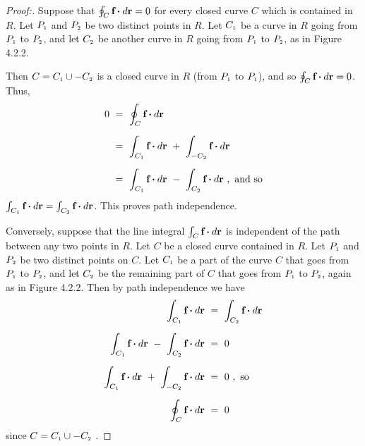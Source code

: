 \begin{proofbar}\begin{proof}[Proof:]
 Suppose that $\oint_{C} \textbf{f} \bm{\cdot} d\textbf{r} = 0$ for every closed curve $C$  which is contained in $R$. Let $P_{\scriptscriptstyle 1}$ and
 $P_{\scriptscriptstyle 2}$ be two distinct points in $R$. Let $C_{\scriptscriptstyle 1}$ be a curve in $R$ going from
 $P_{\scriptscriptstyle 1}$ to $P_{\scriptscriptstyle 2}$, and let $C_{\scriptscriptstyle 2}$ be another curve in $R$ going from $P_{\scriptscriptstyle 1}$ to
 $P_{\scriptscriptstyle 2}$, as in Figure 4.2.2.
 
 \piccaption[]{}
 \par Then $C = C_{\scriptscriptstyle 1} \cup -C_{\scriptscriptstyle 2}$ is a closed curve in $R$ (from
 $P_{\scriptscriptstyle 1}$ to $P_{\scriptscriptstyle 1}$), and so $\oint_{C} \textbf{f} \bm{\cdot} d\textbf{r} = 0$. Thus,
 \begin{align*}
  0 ~&=~ \oint_{C} \textbf{f} \bm{\cdot} d\textbf{r}\\[6pt]
   &=~ \int_{C_{\scriptscriptstyle 1}} \textbf{f} \bm{\cdot} d\textbf{r} ~+~ \int_{-C_{\scriptscriptstyle 2}} \textbf{f} \bm{\cdot} d\textbf{r}\\[6pt]
   &=~ \int_{C_{\scriptscriptstyle 1}} \textbf{f} \bm{\cdot} d\textbf{r} ~-~ \int_{C_{\scriptscriptstyle 2}} \textbf{f} \bm{\cdot} d\textbf{r}~,~\text{and so}
 \end{align*}
 $\int_{C_{\scriptscriptstyle 1}} \textbf{f} \bm{\cdot} d\textbf{r} = \int_{C_{\scriptscriptstyle 2}} \textbf{f} \bm{\cdot} d\textbf{r}$. This proves path independence.

 \par
 Conversely, suppose that the line integral $\int_{C} \textbf{f} \bm{\cdot} d\textbf{r}$ is independent of the path
 between any two points in $R$. Let $C$ be a closed curve contained in $R$. Let $P_{\scriptscriptstyle 1}$ and $P_{\scriptscriptstyle 2}$ be two
 distinct points on $C$. Let $C_{\scriptscriptstyle 1}$ be a part of the curve $C$ that goes from $P_{\scriptscriptstyle 1}$ to $P_{\scriptscriptstyle 2}$, and
 let $C_{\scriptscriptstyle 2}$ be the remaining part of $C$ that goes from $P_{\scriptscriptstyle 1}$ to $P_{\scriptscriptstyle 2}$, again as in Figure 4.2.2.
 Then by path independence we have
 \begin{align*}
  \int_{C_{\scriptscriptstyle 1}} \textbf{f} \bm{\cdot} d\textbf{r} ~&=~ \int_{C_{\scriptscriptstyle 2}} \textbf{f} \bm{\cdot} d\textbf{r}\\[6pt]
  \int_{C_{\scriptscriptstyle 1}} \textbf{f} \bm{\cdot} d\textbf{r} ~-~ \int_{C_{\scriptscriptstyle 2}} \textbf{f} \bm{\cdot} d\textbf{r} ~&=~ 0\\[6pt]
  \int_{C_{\scriptscriptstyle 1}} \textbf{f} \bm{\cdot} d\textbf{r} ~+~ \int_{-C_{\scriptscriptstyle 2}} \textbf{f} \bm{\cdot} d\textbf{r} ~&=~ 0 ~,~\text{so}\\[6pt]
  \oint_{C} \textbf{f} \bm{\cdot} d\textbf{r} ~&=~ 0
 \end{align*}
 since $C = C_{\scriptscriptstyle 1} \cup -C_{\scriptscriptstyle 2}$ . \qedhere
 

\end{proof}
\end{proofbar}
